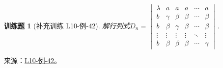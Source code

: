 \documentclass[12pt,fontset=fandol]{ctexart}
\newtheorem{exercise}{训练题}[section]
\begin{document}
\begin{exercise}[补充训练 L10-例-42]\label{prob:L10-例-42}
解行列式$D_n=\begin{vmatrix}
                    \lambda & a      & a      & a      & \cdots & a      \\
                    b       & \gamma & \beta  & \beta  & \cdots & \beta  \\
                    b       & \beta  & \gamma & \beta  & \cdots & \beta  \\
                    \vdots  & \vdots & \vdots & \vdots & \ddots & \vdots \\
                    b       & \beta  & \beta  & \beta  & \cdots & \gamma
                \end{vmatrix}$.
\end{exercise}
\noindent 来源：\href{https://github.com/yhwu-is/Linear-Algebra-Left-Undone/blob/new/%E8%AE%B2%E4%B9%89/%E4%B8%93%E9%A2%98/10%20%E8%A1%8C%E5%88%97%E5%BC%8F.tex}{L10-例-42}。
\end{document}
